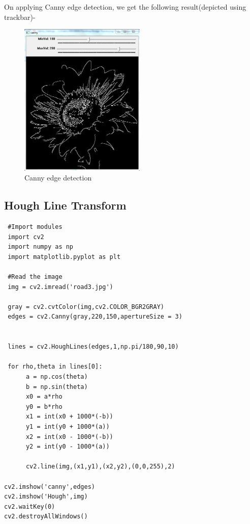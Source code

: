\documentclass[]{article}
\begin{document}
On applying Canny edge detection, we get the following result(depicted
using trackbar)-

\begin{figure}[htbp]
\centering
\includegraphics[width=6cm]{images/Line_Detection/Canny_Images/Canny_trackbar.JPG}
\caption{Canny edge detection}
\end{figure}
\pagebreak
\subsection{Hough Line Transform}\label{hough-line-transform}

\begin{verbatim}
 #Import modules 
 import cv2   
 import numpy as np
 import matplotlib.pyplot as plt

 #Read the image   
 img = cv2.imread('road3.jpg')

 gray = cv2.cvtColor(img,cv2.COLOR_BGR2GRAY)
 edges = cv2.Canny(gray,220,150,apertureSize = 3)


 lines = cv2.HoughLines(edges,1,np.pi/180,90,10)

 for rho,theta in lines[0]:
      a = np.cos(theta)
      b = np.sin(theta)
      x0 = a*rho
      y0 = b*rho
      x1 = int(x0 + 1000*(-b))
      y1 = int(y0 + 1000*(a))
      x2 = int(x0 - 1000*(-b))
      y2 = int(y0 - 1000*(a))

      cv2.line(img,(x1,y1),(x2,y2),(0,0,255),2)

cv2.imshow('canny',edges)
cv2.imshow('Hough',img)
cv2.waitKey(0)
cv2.destroyAllWindows()
\end{verbatim}
\end{document}
